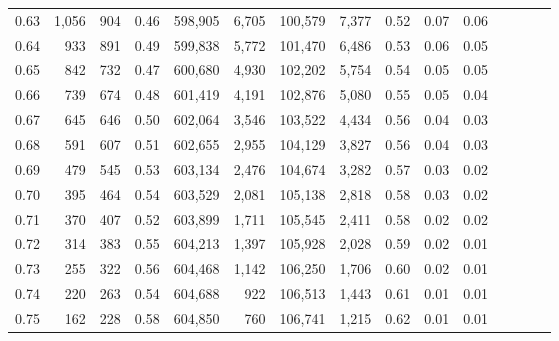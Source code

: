 \begin{tabular}{rrrcrrrrrrrrrrr}
0.63 &   1,056 &    904 &                                       0.46 &  598,905 &    6,705 &  100,579 &    7,377 &  0.52 &  0.07 &                         0.06 \\
0.64 &     933 &    891 &                                       0.49 &  599,838 &    5,772 &  101,470 &    6,486 &  0.53 &  0.06 &                         0.05 \\
0.65 &     842 &    732 &                                       0.47 &  600,680 &    4,930 &  102,202 &    5,754 &  0.54 &  0.05 &                         0.05 \\
0.66 &     739 &    674 &                                       0.48 &  601,419 &    4,191 &  102,876 &    5,080 &  0.55 &  0.05 &                         0.04 \\
0.67 &     645 &    646 &                                       0.50 &  602,064 &    3,546 &  103,522 &    4,434 &  0.56 &  0.04 &                         0.03 \\
0.68 &     591 &    607 &                                       0.51 &  602,655 &    2,955 &  104,129 &    3,827 &  0.56 &  0.04 &                         0.03 \\
0.69 &     479 &    545 &                                       0.53 &  603,134 &    2,476 &  104,674 &    3,282 &  0.57 &  0.03 &                         0.02 \\
0.70 &     395 &    464 &                                       0.54 &  603,529 &    2,081 &  105,138 &    2,818 &  0.58 &  0.03 &                         0.02 \\
0.71 &     370 &    407 &                                       0.52 &  603,899 &    1,711 &  105,545 &    2,411 &  0.58 &  0.02 &                         0.02 \\
0.72 &     314 &    383 &                                       0.55 &  604,213 &    1,397 &  105,928 &    2,028 &  0.59 &  0.02 &                         0.01 \\
0.73 &     255 &    322 &                                       0.56 &  604,468 &    1,142 &  106,250 &    1,706 &  0.60 &  0.02 &                         0.01 \\
0.74 &     220 &    263 &                                       0.54 &  604,688 &      922 &  106,513 &    1,443 &  0.61 &  0.01 &                         0.01 \\
0.75 &     162 &    228 &                                       0.58 &  604,850 &      760 &  106,741 &    1,215 &  0.62 &  0.01 &                         0.01 \\

\end{tabular}
